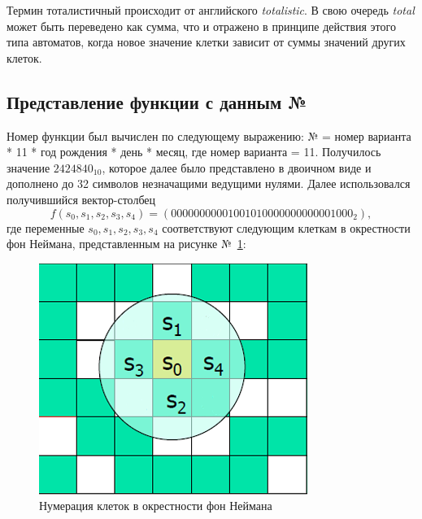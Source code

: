 \documentclass[a4paper, final]{article}
\begin{document}
Термин тоталистичный происходит от английского \textit{totalistic}. В свою очередь 
\textit{total} может быть переведено как сумма, что и отражено в принципе действия этого 
типа автоматов, когда новое значение клетки зависит от суммы значений других клеток.

\subsection{Представление функции с данным №}
Номер функции был вычислен по следующему выражению: № = номер варианта * 11 * год рождения * день * месяц,
где номер варианта = 11. Получилось значение $2424840_{10}$, которое далее было представлено в двоичном
виде и дополнено до 32 символов незначащими ведущими нулями. Далее использовался  получившийся 
вектор-столбец 
$$f(s_0, s_1, s_2, s_3, s_4) = (00000000001001010000000000001000_2),$$
\noindent где переменные $s_0, s_1, s_2, s_3, s_4$ соответствуют следующим клеткам в окрестности 
фон Неймана, представленным на рисунке №~\ref{img:neyman_vars}:
\begin{figure}[H]
   \centering
   \includegraphics[scale=1]{neyman_vars.png}
   \caption{Нумерация клеток в окрестности фон Неймана}
   \label{img:neyman_vars}
\end{figure}

\newpage
\end{document}
